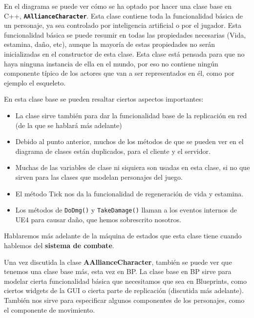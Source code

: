 En el diagrama se puede ver cómo se ha optado por hacer una clase base en C++, \texttt{\textbf{AAllianceCharacter}}. Esta clase contiene toda la funcionalidad básica de un personaje, ya sea controlado por inteligencia artificial o por el jugador. Esta funcionalidad básica se puede resumir en todas las propiedades necesarias (Vida, estamina, daño, etc), aunque la mayoría de estas propiedades no serán inicializadas en el constructor de esta clase. Esta clase está pensada para que no haya ninguna instancia de ella en el mundo, por eso no contiene ningún componente típico de los actores que van a ser representados en él, como por ejemplo el esqueleto.


En esta clase base se pueden resaltar ciertos aspectos importantes:
\begin{itemize}
\item La clase sirve también para dar la funcionalidad base de la replicación en red (de la que se hablará más adelante)
\item Debido al punto anterior, muchos de los métodos de que se pueden ver en el diagrama de clases están duplicados, para el cliente y el servidor.
\item Muchas de las variables de clase ni siquiera son usadas en esta clase, si no que sirven para las clases que modelan personajes del juego.
\item El método Tick nos da la funcionalidad de regeneración de vida y estamina.
\item Los métodos de \texttt{DoDmg()} y \texttt{TakeDamage()} llaman a los eventos internos de \ac{UE4} para causar daño, que hemos sobrescrito nosotros.
\end{itemize}


Hablaremos más adelante de la máquina de estados que esta clase tiene cuando hablemos del \textbf{sistema de combate}.


Una vez discutida la clase \textbf{AAllianceCharacter}, también se puede ver que tenemos una clase base más, esta vez en \ac{BP}. La clase base en \ac{BP} sirve para modelar cierta funcionalidad básica que necesitamos que sea en Blueprints, como ciertos widgets de la \ac{GUI} o cierta parte de replicación (discutida más adelante). También nos sirve para especificar algunos componentes de los personajes, como el componente de movimiento.


